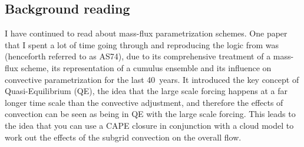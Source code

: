 \documentclass[11pt,a4paper]{article}
\begin{document}
\subsection{Background reading}

%
%
%

I have continued to read about mass-flux parametrization schemes. One paper that I spent a lot of
time going through and reproducing the logic from was \cite{arakawa1974interaction} (henceforth
referred to as AS74), due to its comprehensive treatment of a mass-flux scheme, its representation
of a cumulus ensemble and its influence on convective parametrization for the last \SI{40}{years}.
It introduced the key concept of Quasi-Equilibrium (QE), the idea that the large scale forcing
happens at a far longer time scale than the convective adjustment, and therefore the effects of
convection can be seen as being in QE with the large scale forcing. This leads to the idea that you
can use a CAPE closure in conjunction with a cloud model to work out the effects of the subgrid
convection on the overall flow.
\end{document}
